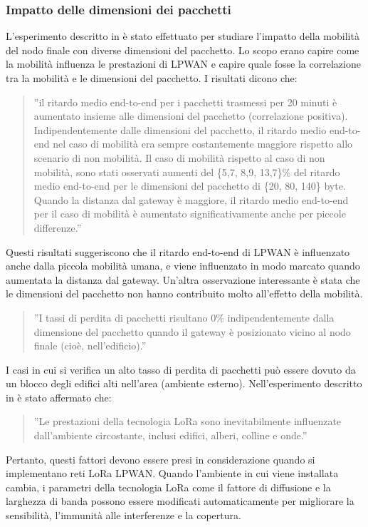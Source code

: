 \documentclass[a4paper]{report} %
\begin{document}
\subsubsection{Impatto delle dimensioni dei pacchetti} 
L'esperimento descritto in \cite{art:rif.47} è stato effettuato per studiare l'impatto della mobilità del nodo finale con diverse dimensioni del pacchetto. Lo scopo erano capire come la mobilità influenza le prestazioni di LPWAN e capire quale fosse la correlazione tra la mobilità e le dimensioni del pacchetto. I risultati dicono che:
\begin{quote}
	''il ritardo medio end-to-end per i pacchetti trasmessi per 20 minuti è aumentato insieme alle dimensioni del pacchetto (correlazione positiva). 
	Indipendentemente dalle dimensioni del pacchetto, il ritardo medio end-to-end nel caso di mobilità era sempre costantemente maggiore rispetto allo scenario di non mobilità. 
	Il caso di mobilità rispetto al caso di non mobilità, sono stati osservati aumenti del \{5,7, 8,9, 13,7\}\% del ritardo medio end-to-end per le dimensioni del pacchetto di \{20, 80, 140\} byte. 
	Quando la distanza dal gateway è maggiore, il ritardo medio end-to-end per il caso di mobilità è aumentato significativamente anche per piccole differenze.''
\end{quote}
Questi risultati suggeriscono che il ritardo end-to-end di LPWAN è influenzato anche dalla piccola mobilità umana, e viene influenzato in modo marcato quando aumentata la distanza dal gateway. Un'altra osservazione interessante è stata che le dimensioni del pacchetto non hanno contribuito molto all'effetto della mobilità. 
\begin{quote}
	''I tassi di perdita di pacchetti risultano 0\% indipendentemente dalla dimensione del pacchetto quando il gateway è posizionato vicino al nodo finale (cioè, nell'edificio).''
\end{quote}
I casi in cui si verifica un alto tasso di perdita di pacchetti può essere dovuto da un blocco degli edifici alti nell'area (ambiente esterno). 
Nell'esperimento descritto in \cite{art:rif.44} è stato affermato che:
\begin{quote}
	''Le prestazioni della tecnologia LoRa sono inevitabilmente influenzate dall'ambiente circostante, inclusi edifici, alberi, colline e onde.''
\end{quote}
Pertanto, questi fattori devono essere presi in considerazione quando si implementano reti LoRa LPWAN. Quando l'ambiente in cui viene installata cambia,  i parametri della tecnologia LoRa come il fattore di diffusione e la larghezza di banda possono essere modificati automaticamente per migliorare la sensibilità, l'immunità alle interferenze e la copertura.
\end{document}
